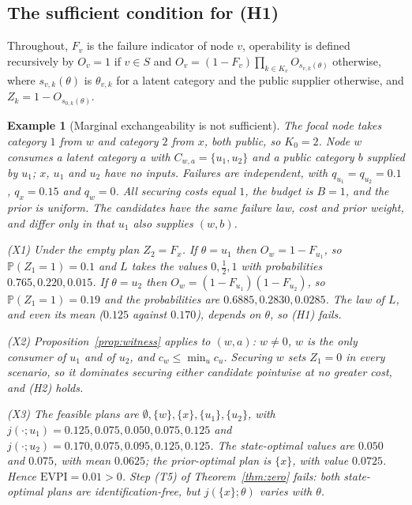 \documentclass[pdflatex,sn-mathphys-num]{sn-jnl}
\theoremstyle{thmstyleone}
\theoremstyle{thmstyletwo}
\newtheorem{example}{Example}
\theoremstyle{thmstylethree}
\newcommand{\evpi}{\mathrm{EVPI}}
\begin{document}
\begin{appendices}

\section{The sufficient condition for (H1)}\label{app:H1}

Throughout, $F_v$ is the failure indicator of node $v$, operability is
defined recursively by $O_v=1$ if $v\in S$ and
$O_v=(1-F_v)\prod_{k\in K_v}O_{s_{v,k}(\theta)}$ otherwise, where
$s_{v,k}(\theta)$ is $\theta_{v,k}$ for a latent category and the public
supplier otherwise, and $Z_k=1-O_{s_{0,k}(\theta)}$.

\begin{example}[Marginal exchangeability is not sufficient]\label{ex:marginal}
The focal node takes category $1$ from $w$ and category $2$ from $x$, both
public, so $K_0=2$. Node $w$ consumes a latent category $a$ with
$C_{w,a}=\{u_1,u_2\}$ and a public category $b$ supplied by $u_1$; $x$, $u_1$
and $u_2$ have no inputs. Failures are independent, with
$q_{u_1}=q_{u_2}=0.1$, $q_x=0.15$ and $q_w=0$. All securing costs equal $1$,
the budget is $B=1$, and the prior is uniform. The candidates have the same
failure law, cost and prior weight, and differ only in that $u_1$ also
supplies $(w,b)$.

\noindent(X1) Under the empty plan $Z_2=F_x$. If $\theta=u_1$ then
$O_w=1-F_{u_1}$, so $\mathbb P(Z_1=1)=0.1$ and $L$ takes the values
$0,\tfrac12,1$ with probabilities $0.765,0.220,0.015$. If $\theta=u_2$ then
$O_w=(1-F_{u_1})(1-F_{u_2})$, so $\mathbb P(Z_1=1)=0.19$ and the
probabilities are $0.6885,0.2830,0.0285$. The law of $L$, and even its mean
($0.125$ against $0.170$), depends on $\theta$, so (H1) fails.

\noindent(X2) Proposition~\ref{prop:witness} applies to $(w,a)$: $w\ne0$,
$w$ is the only consumer of $u_1$ and of $u_2$, and $c_w\le\min_uc_u$.
Securing $w$ sets $Z_1=0$ in every scenario, so it dominates securing either
candidate pointwise at no greater cost, and (H2) holds.

\noindent(X3) The feasible plans are $\emptyset,\{w\},\{x\},\{u_1\},\{u_2\}$,
with $j(\cdot;u_1)=0.125,0.075,0.050,0.075,0.125$ and
$j(\cdot;u_2)=0.170,0.075,0.095,0.125,0.125$. The state-optimal values are
$0.050$ and $0.075$, with mean $0.0625$; the prior-optimal plan is $\{x\}$,
with value $0.0725$. Hence $\evpi=0.01>0$. Step (T5) of
Theorem~\ref{thm:zero} fails: both state-optimal plans are
identification-free, but $j(\{x\};\theta)$ varies with $\theta$.


\end{example}
\end{appendices}
\end{document}
